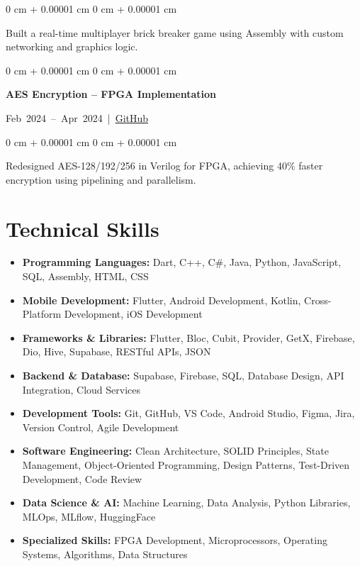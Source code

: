 \documentclass[10pt, letterpaper]{article}
\newenvironment{highlights}{
\begin{itemize}[
topsep=0.10 cm,
parsep=0.10 cm,
partopsep=0pt,
itemsep=0pt,
leftmargin=0 cm + 10pt
]
}{
\end{itemize}
} %
\newenvironment{onecolentry}{
\begin{adjustwidth}{
0 cm + 0.00001 cm
}{
0 cm + 0.00001 cm
}
}{
\end{adjustwidth}
} %
\newenvironment{twocolentry}[2][]{
\onecolentry
\def\secondColumn{#2}
\setcolumnwidth{\fill, 4.5 cm}
\begin{paracol}{2}
}{
\switchcolumn \raggedleft \secondColumn
\end{paracol}
\endonecolentry
} %
\let\hrefWithoutArrow\href
\begin{document}
\begin{onecolentry}
\begin{highlights}
Built a real-time multiplayer brick breaker game using Assembly with custom networking and graphics logic.
\end{highlights}
\end{onecolentry}
\vspace{0.2 cm}

\begin{twocolentry}{
\mbox{Feb 2024 – Apr 2024 | \hrefWithoutArrow{https://github.com/KarimmYasser/AES}{GitHub}}%
}
\textbf{AES Encryption – FPGA Implementation}
\end{twocolentry}

\begin{onecolentry}
\begin{highlights}
Redesigned AES-128/192/256 in Verilog for FPGA, achieving 40\% faster encryption using pipelining and parallelism.
\end{highlights}
\end{onecolentry}



\vspace{0.2 cm}


\section{Technical Skills}
\vspace{0.1cm}

\begin{highlights}
\item \textbf{Programming Languages:} Dart, C++, C\#, Java, Python, JavaScript, SQL, Assembly, HTML, CSS
\item \textbf{Mobile Development:} Flutter, Android Development, Kotlin, Cross-Platform Development, iOS Development
\item \textbf{Frameworks \& Libraries:} Flutter, Bloc, Cubit, Provider, GetX, Firebase, Dio, Hive, Supabase, RESTful APIs, JSON
\item \textbf{Backend \& Database:} Supabase, Firebase, SQL, Database Design, API Integration, Cloud Services
\item \textbf{Development Tools:} Git, GitHub, VS Code, Android Studio, Figma, Jira, Version Control, Agile Development
\item \textbf{Software Engineering:} Clean Architecture, SOLID Principles, State Management, Object-Oriented Programming, Design Patterns, Test-Driven Development, Code Review
\item \textbf{Data Science \& AI:} Machine Learning, Data Analysis, Python Libraries, MLOps, MLflow, HuggingFace
\item \textbf{Specialized Skills:} FPGA Development, Microprocessors, Operating Systems, Algorithms, Data Structures
\end{highlights}
\end{document}
